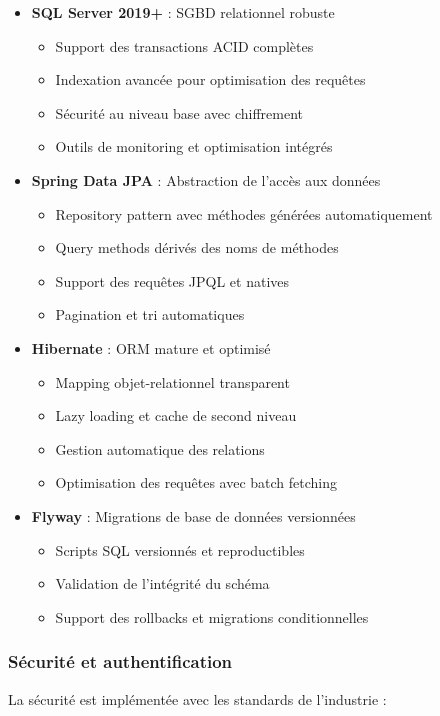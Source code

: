 \documentclass[12pt,a4paper]{report}
\begin{document}
\begin{itemize}
\item \textbf{SQL Server 2019+} : SGBD relationnel robuste
  \begin{itemize}
  \item Support des transactions ACID complètes
  \item Indexation avancée pour optimisation des requêtes
  \item Sécurité au niveau base avec chiffrement
  \item Outils de monitoring et optimisation intégrés
  \end{itemize}

\item \textbf{Spring Data JPA} : Abstraction de l'accès aux données
  \begin{itemize}
  \item Repository pattern avec méthodes générées automatiquement
  \item Query methods dérivés des noms de méthodes
  \item Support des requêtes JPQL et natives
  \item Pagination et tri automatiques
  \end{itemize}

\item \textbf{Hibernate} : ORM mature et optimisé
  \begin{itemize}
  \item Mapping objet-relationnel transparent
  \item Lazy loading et cache de second niveau
  \item Gestion automatique des relations
  \item Optimisation des requêtes avec batch fetching
  \end{itemize}

\item \textbf{Flyway} : Migrations de base de données versionnées
  \begin{itemize}
  \item Scripts SQL versionnés et reproductibles
  \item Validation de l'intégrité du schéma
  \item Support des rollbacks et migrations conditionnelles
  \end{itemize}
\end{itemize}

\subsubsection{Sécurité et authentification}
La sécurité est implémentée avec les standards de l'industrie :
\end{document}
